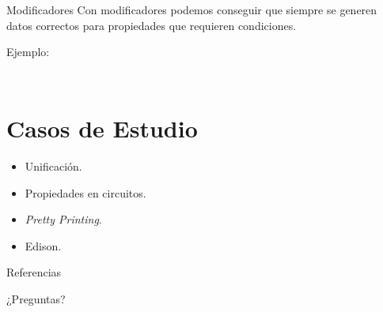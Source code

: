 \documentclass[10pt]{beamer}
\newcommand\Fontvi{\fontsize{10}{12}\selectfont}
\begin{document}
\begin{frame}[standout]
  \Fontvi
  \inputminted{text}{data/modificadores_prueba.txt}
\end{frame}

\begin{frame}{Modificadores}    %
  Con modificadores podemos conseguir que siempre se generen datos
  correctos para propiedades que requieren condiciones.

  Ejemplo:
  \inputminted{haskell}{data/modificadores2.hs}
\end{frame}

\begin{frame}[standout]
  \Fontvi
  \inputminted{text}{data/modificadores2_pruebas.txt}
\end{frame}

\section{Casos de Estudio}

\begin{frame}
  \begin{itemize}
  \item Unificación.
  \item Propiedades en circuitos.
  \item \textit{Pretty Printing}.
  \item Edison.
  \end{itemize}
\end{frame}

\appendix

\begin{frame}{Referencias}

  
  

\end{frame}

\begin{frame}[standout]
  ¿Preguntas?
\end{frame}
\end{document}
